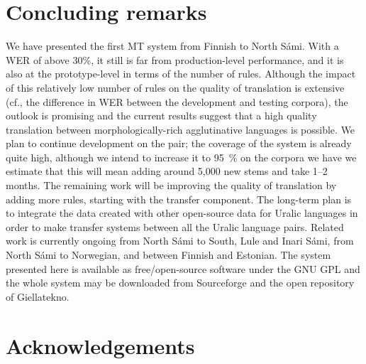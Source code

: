 \documentclass{flammie}
\newif\iffinal
\begin{document}
\section{Concluding remarks}
\label{sec:conclusions}

We have presented the first MT system from Finnish to North Sámi.
With a WER of above 30\%, it still is far from production-level performance, and it is also at the prototype-level in terms of the number of rules.
Although the impact of this relatively low number of rules on the quality of translation is extensive (cf., the difference in WER between the development and testing corpora), the outlook is promising and the current results suggest that a high quality translation between morphologically-rich agglutinative languages is possible.
We plan to continue development on the pair; the coverage of the system is already quite high, although we intend to increase it to 95~\% on the corpora we have
we estimate that this will mean adding around 5,000 new stems and take 1–2 months.
The remaining work will be improving the quality of translation by adding more rules, starting with the transfer component.
The long-term plan is to integrate the data created with other open-source data for Uralic languages in order to make transfer systems between all the Uralic language pairs.
Related work is currently ongoing from North Sámi to South, Lule and Inari Sámi, from North  Sámi to Norwegian, and between Finnish and Estonian.
The system presented here is available as free/open-source software under the GNU GPL and the whole system may be downloaded from Sourceforge and the open repository of Giellatekno.


\section*{Acknowledgements}
\label{sec:acknowlegdements}
\iffinal
The work on this North Sámi-Finnish machine translation system was partially funded by the Google Summer of Code and Google Code-In programmes, and partly by a Norsk forsingsråd grant (234299) on machine translation between Sámi languages.
\fi


\end{document}
